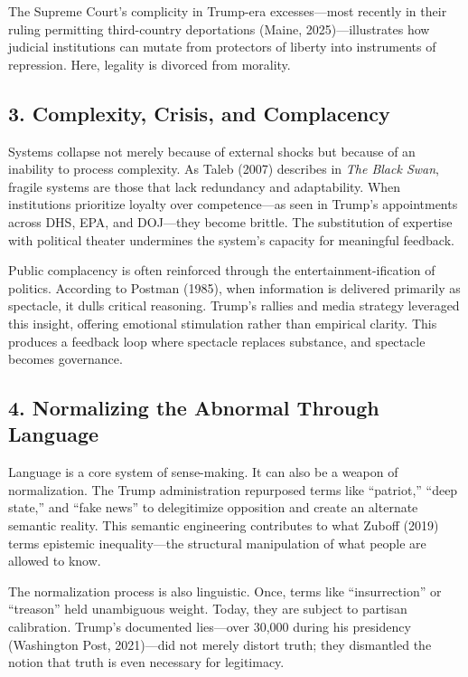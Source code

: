 The Supreme Court's complicity in Trump-era excesses---most recently in
their ruling permitting third-country deportations (Maine,
2025)---illustrates how judicial institutions can mutate from protectors
of liberty into instruments of repression. Here, legality is divorced
from morality.

\subsection{3. Complexity, Crisis, and
Complacency}\label{complexity-crisis-and-complacency}

Systems collapse not merely because of external shocks but because of an
inability to process complexity. As Taleb (2007) describes in \emph{The
Black Swan}, fragile systems are those that lack redundancy and
adaptability. When institutions prioritize loyalty over competence---as
seen in Trump's appointments across DHS, EPA, and DOJ---they become
brittle. The substitution of expertise with political theater undermines
the system's capacity for meaningful feedback.

Public complacency is often reinforced through the
entertainment-ification of politics. According to Postman (1985), when
information is delivered primarily as spectacle, it dulls critical
reasoning. Trump's rallies and media strategy leveraged this insight,
offering emotional stimulation rather than empirical clarity. This
produces a feedback loop where spectacle replaces substance, and
spectacle becomes governance.

\subsection{4. Normalizing the Abnormal Through
Language}\label{normalizing-the-abnormal-through-language}

Language is a core system of sense-making. It can also be a weapon of
normalization. The Trump administration repurposed terms like
``patriot,'' ``deep state,'' and ``fake news'' to delegitimize
opposition and create an alternate semantic reality. This semantic
engineering contributes to what Zuboff (2019) terms epistemic
inequality---the structural manipulation of what people are allowed to
know.

The normalization process is also linguistic. Once, terms like
``insurrection'' or ``treason'' held unambiguous weight. Today, they are
subject to partisan calibration. Trump's documented lies---over 30,000
during his presidency (Washington Post, 2021)---did not merely distort
truth; they dismantled the notion that truth is even necessary for
legitimacy.

